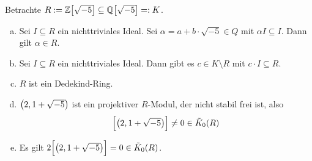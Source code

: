 \begin{beispiel}
    Betrachte $R := \mathbb{Z} \benbrace*{\sqrt{-5}} \subseteq \mathbb{Q} \benbrace*{\sqrt{-5}} =: K$.
    \begin{enumerate}[a)]
        \item Sei $I \subseteq R$ ein nichttriviales Ideal.
        Sei $\alpha = a + b \cdot \sqrt{-5} \in Q$ mit $\alpha I \subseteq I$.
        Dann gilt $\alpha \in R$.
        \item Sei $I \subseteq R$ ein nichttriviales Ideal.
        Dann gibt es $c \in K \setminus R$ mit $c \cdot I \subseteq R$.
        \item $R$ ist ein Dedekind-Ring.
        \item $\enbrace*{2, 1 + \sqrt{-5}}$ ist ein projektiver $R$-Modul, der nicht stabil frei ist, also
        \[
            \benbrace[\Big]{\enbrace[\big]{2, 1+ \sqrt{-5}}} \neq 0 \in \tilde{K}_0(R)
        \]
        \item Es gilt $2 \benbrace[\Big]{\enbrace[\big]{2, 1+ \sqrt{-5}}} =0 \in \tilde{K}_0(R)$.
    \end{enumerate}
\end{beispiel}
